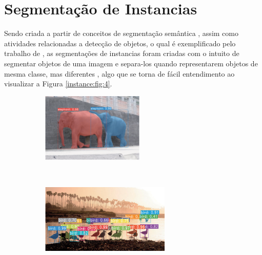 \newpage
\clearpage
\section{Segmentação de Instancias}
\label{instance:instance}

Sendo criada a partir de conceitos de segmentação semântica \cite{Minaee2021}, assim como atividades relacionadas a detecção de objetos, o qual é exemplificado pelo trabalho de \cite{Vaillant1994}, as segmentações de instancias foram criadas com o intuito de segmentar objetos de uma imagem e separa-los quando representarem objetos de mesma classe, mas diferentes \cite{Hafiz2020}, algo que se torna de fácil entendimento ao visualizar a Figura \ref{instance:fig:4}.

\begin{figure}[H]
   \caption{Exemplos de segmentação de instancia.}
   \centering
   \label{instance:fig:4}
    \begin{subfigure}[t]{0.45\textwidth}
        \centering
        \includegraphics[height=1.3in]{recursos/imagens/instance/ins1.png}
        \label{instance:fig:4.1}
    \end{subfigure}%
    ~ 
    \begin{subfigure}[t]{0.45\textwidth}
        \centering
        \includegraphics[height=1.3in]{recursos/imagens/instance/ins3.png}
        \label{instance:fig:4.2}
    \end{subfigure}%
    ~ 
    

\end{figure}
